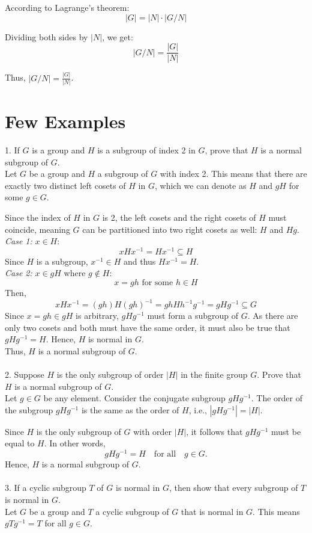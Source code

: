 According to Lagrange's theorem:
\[ |G| = |N| \cdot |G/N| \]

Dividing both sides by \( |N| \), we get:
\[ |G/N| = \frac{|G|}{|N|} \]

Thus, \( |G/N| = \frac{|G|}{|N|} \).
\\
\section{Few Examples}
1. If \( G \) is a group and \( H \) is a subgroup of index 2 in \( G \), prove that \( H \) is a normal subgroup of \( G \).
\\
Let \( G \) be a group and \( H \) a subgroup of \( G \) with index 2. This means that there are exactly two distinct left cosets of \( H \) in \( G \), which we can denote as \( H \) and \( gH \) for some \( g \in G \).

Since the index of \( H \) in \( G \) is 2, the left cosets and the right cosets of \( H \) must coincide, meaning \( G \) can be partitioned into two right cosets as well: \( H \) and \( Hg \).\\
\textit{Case 1:} \( x \in H \):
   \[
   xHx^{-1} = Hx^{-1} \subseteq H
   \]
   Since \( H \) is a subgroup, \( x^{-1} \in H \) and thus \( Hx^{-1} = H \).
\\
\textit{Case 2: }\( x \in gH \) where \( g \notin H \):
   \[
   x = gh \text{ for some } h \in H
   \]
   Then,
   \[
   xHx^{-1} = (gh)H(gh)^{-1} = ghHh^{-1}g^{-1} = gHg^{-1} \subseteq G
   \]
Since \( x = gh \in gH \) is arbitrary, \( gHg^{-1} \) must form a subgroup of \( G \). As there are only two cosets and both must have the same order, it must also be true that \( gHg^{-1} = H \).
Hence, \( H \) is normal in \( G \).
\\
Thus, \( H \) is a normal subgroup of \( G \).
\\
\\
2. Suppose \( H \) is the only subgroup of order \( |H| \) in the finite group \( G \). Prove that \( H \) is a normal subgroup of \( G \).
\\
Let \( g \in G \) be any element. Consider the conjugate subgroup \( gHg^{-1} \). The order of the subgroup \( gHg^{-1} \) is the same as the order of \( H \), i.e., \( |gHg^{-1}| = |H| \).

Since \( H \) is the only subgroup of \( G \) with order \( |H| \), it follows that \( gHg^{-1} \) must be equal to \( H \). In other words,
\[
gHg^{-1} = H \quad \text{for all} \quad g \in G.
\]
Hence, \( H \) is a normal subgroup of \( G \).
\\
\\
3. If a cyclic subgroup \( T \) of \( G \) is normal in \( G \), then show that every subgroup of \( T \) is normal in \( G \).
\\
Let \( G \) be a group and \( T \) a cyclic subgroup of \( G \) that is normal in \( G \). This means \( gTg^{-1} = T \) for all \( g \in G \).

